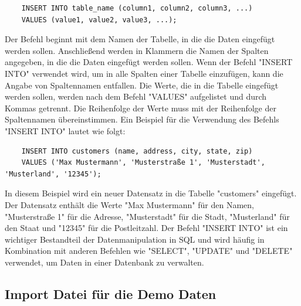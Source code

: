 \begin{verbatim}
    INSERT INTO table_name (column1, column2, column3, ...)
    VALUES (value1, value2, value3, ...);
\end{verbatim}


Der Befehl beginnt mit dem Namen der Tabelle, in die die Daten eingefügt werden sollen. Anschließend werden in Klammern die Namen der Spalten angegeben, in die die Daten eingefügt werden sollen. Wenn der Befehl "INSERT INTO" verwendet wird, um in alle Spalten einer Tabelle einzufügen, kann die Angabe von Spaltennamen entfallen.
\newline
\newline
Die Werte, die in die Tabelle eingefügt werden sollen, werden nach dem Befehl "VALUES" aufgelistet und durch Kommas getrennt. Die Reihenfolge der Werte muss mit der Reihenfolge der Spaltennamen übereinstimmen.
\newline
\newline
Ein Beispiel für die Verwendung des Befehls "INSERT INTO" lautet wie folgt:
\begin{verbatim}
    INSERT INTO customers (name, address, city, state, zip)
    VALUES ('Max Mustermann', 'Musterstraße 1', 'Musterstadt', 'Musterland', '12345');
\end{verbatim}


In diesem Beispiel wird ein neuer Datensatz in die Tabelle "customers" eingefügt. Der Datensatz enthält die Werte "Max Mustermann" für den Namen, "Musterstraße 1" für die Adresse, "Musterstadt" für die Stadt, "Musterland" für den Staat und "12345" für die Postleitzahl.
\newline
\newline
Der Befehl "INSERT INTO" ist ein wichtiger Bestandteil der Datenmanipulation in SQL und wird häufig in Kombination mit anderen Befehlen wie "SELECT", "UPDATE" und "DELETE" verwendet, um Daten in einer Datenbank zu verwalten.
\newpage

\subsection{Import Datei für die Demo Daten}

